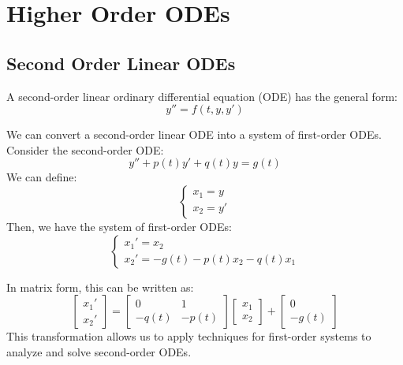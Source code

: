 \documentclass[11pt]{article}
\begin{document}
\section{Higher Order ODEs}
\subsection{Second Order Linear ODEs}

\begin{definition}
    A second-order linear ordinary differential equation (ODE) has the general form:
    \begin{equation}
     y'' = f(t, y, y')
    \end{equation}
    
\end{definition}

\begin{example} \label{ex:2ndOrderTo1stOrder}
    We can convert a second-order linear ODE into a system of first-order ODEs. Consider the second-order ODE:
    $$
     y'' + p(t)y' + q(t)y = g(t)
    $$
    We can define:
    $$\begin{cases}
    x_1 = y \\
    x_2 = y'
    \end{cases}$$
    Then, we have the system of first-order ODEs:
    $$\begin{cases}
    x_1' = x_2 \\
    x_2' = -g(t) - p(t)x_2 - q(t)x_1
    \end{cases}$$

    In matrix form, this can be written as:
    $$\begin{bmatrix}
    x_1' \\ x_2'
    \end{bmatrix} = \begin{bmatrix}
    0 & 1 \\
    -q(t) & -p(t)
    \end{bmatrix} \begin{bmatrix}
    x_1 \\ x_2
    \end{bmatrix} + \begin{bmatrix}
    0 \\ -g(t)
    \end{bmatrix}$$ 
    This transformation allows us to apply techniques for first-order systems to analyze and solve second-order ODEs. 
    
\end{example}
\end{document}
